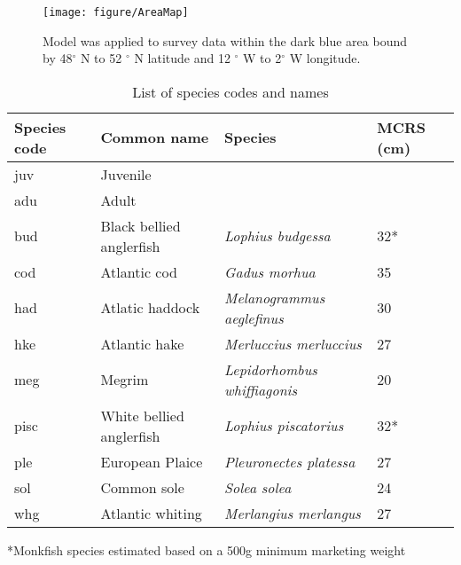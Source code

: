 \documentclass[11pt]{article}
\begin{document}
\begin{figure}[!htb]
\texttt{[image: figure/AreaMap]}
\label{fig:1}
\caption{Model was applied to survey data within the dark blue area bound by
	48$^{\circ}$ N to 52 $^{\circ}$ N latitude and 12 $^{\circ}$ W to
	2$^{\circ}$ W longitude.}
\end{figure}

\begin{table}[!htb]
	\caption{List of species codes and names}
	\label{tab:1}
	\center
	\begin{tabular}{ p{3cm} p{4cm} p{5cm} p{2cm}}
		\hline
		Species code & Common name              & Species & MCRS (cm) \\
		\hline
		juv          & Juvenile                 & & \\
		adu          & Adult                    & & \\
		\hline
		bud          & Black bellied anglerfish & \textit{Lophius budgessa} & 32* \\
		cod          & Atlantic cod             & \textit{Gadus morhua} & 35 \\
		had          & Atlatic haddock          & \textit{Melanogrammus	aeglefinus} & 30 \\
		hke          & Atlantic hake            & \textit{Merluccius merluccius} & 27 \\
		meg          & Megrim                   & \textit{Lepidorhombus whiffiagonis} & 20\\
		pisc         & White bellied anglerfish & \textit{Lophius piscatorius} & 32* \\
		ple          & European Plaice          & \textit{Pleuronectes platessa} & 27 \\
		sol          & Common sole              & \textit{Solea solea} & 24 \\
		whg          & Atlantic whiting         & \textit{Merlangius merlangus} & 27 \\
		\hline
		\end{tabular}
		*Monkfish species estimated based on a 500g minimum marketing
		weight

\end{table}
\end{document}
